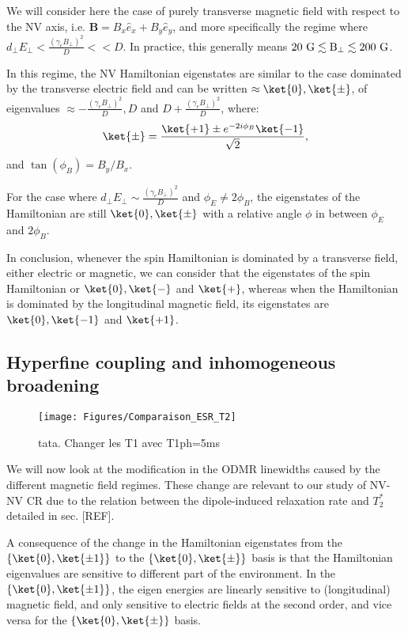 \documentclass[a4paper,11pt]{report}
\begin{document}
We will consider here the case of purely transverse magnetic field with respect to the NV axis, i.e. $\mathbf{B}=B_x \hat{e}_x + B_y \hat e_y$, and more specifically the regime where $d_\perp E_\perp < \frac{(\gamma_e B_\perp)^2}{D} << D$. In practice, this generally means $20\ \rm G \lesssim B_\perp \lesssim 200\ \rm G$.

In this regime, the NV Hamiltonian eigenstates are similar to the case dominated by the transverse electric field and can be written $\approx \ket{0}, \ket{\pm}$\citep{qiu2021nuclear, qiu2022nanoscale}, of eigenvalues $\approx -\frac{(\gamma_e B_\perp)^2}{D},D$ and $D+\frac{(\gamma_e B_\perp)^2}{D}$,  where:
\begin{equation}
\ket{\pm}=\frac{\ket{+1}\pm e^{-2i\phi_B}\ket{-1}}{\sqrt{2}},
\end{equation}
and $\tan(\phi_B)=B_y/B_x$.

For the case where $d_\perp E_\perp \sim \frac{(\gamma_e B_\perp)^2}{D}$ and $\phi_E \neq 2\phi_B$, the eigenstates of the Hamiltonian are still $\ket{0},\ket{\pm}$ with a relative angle $\phi$ in between $\phi_E$ and $2\phi_B$.

In conclusion, whenever the spin Hamiltonian is dominated by a transverse field, either electric or magnetic, we can consider that the eigenstates of the spin Hamiltonian or $\ket{0}, \ket{-}$ and $\ket{+}$, whereas when the Hamiltonian is dominated by the longitudinal magnetic field, its eigenstates are $\ket{0}, \ket{-1}$ and $\ket{+1}$.

\subsection{Hyperfine coupling and inhomogeneous broadening}
\label{sec modif T2*}
\begin{figure}[h]
\centering
\texttt{[image: Figures/Comparaison\_ESR\_T2]}
\caption{tata. Changer les T1 avec T1ph=5ms}
\label{ESR for T2*}
\end{figure}

We will now look at the modification in the ODMR linewidths caused by the different magnetic field regimes. These change are relevant to our study of NV-NV CR due to the relation between the dipole-induced relaxation rate and $T_2^*$ detailed in sec. [REF].

A consequence of the change in the Hamiltonian eigenstates from the $\{ \ket{0}, \ket{\pm 1} \}$ to the $\{ \ket{0}, \ket{\pm} \}$ basis is that the Hamiltonian eigenvalues are sensitive to different part of the environment. In the $\{ \ket{0}, \ket{\pm 1} \}$, the eigen energies are linearly sensitive to (longitudinal) magnetic field, and only sensitive to electric fields at the second order, and vice versa for the $\{ \ket{0}, \ket{\pm} \}$ basis.
\end{document}
